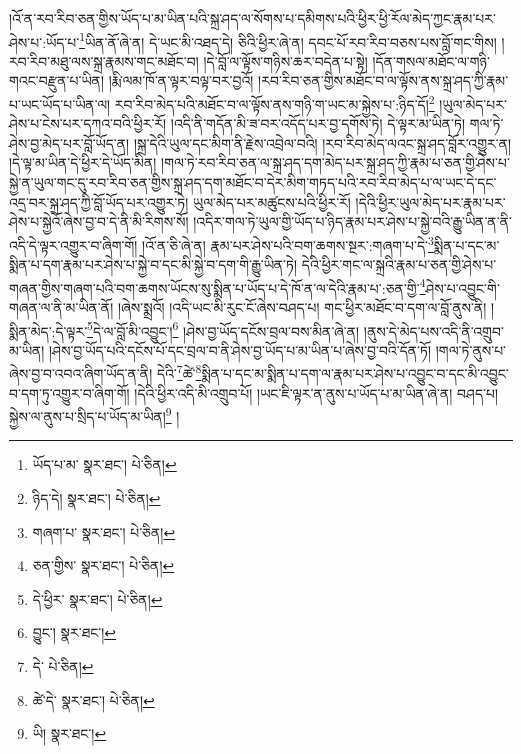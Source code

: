 །འོ་ན་རབ་རིབ་ཅན་གྱིས་ཡོད་པ་མ་ཡིན་པའི་སྐྲ་ཤད་ལ་སོགས་པ་དམིགས་པའི་ཕྱིར་ཕྱི་རོལ་མེད་ཀྱང་རྣམ་པར་ཤེས་པ་:ཡོད་པ་\footnote{ཡོད་པ་མ་  སྣར་ཐང་།  པེ་ཅིན། }ཡིན་ནོ་ཞེ་ན། དེ་ཡང་མི་འཐད་དེ། ཅིའི་ཕྱིར་ཞེ་ན། དབང་པོ་རབ་རིབ་བཅས་པས་བློ་གང་གིས། །རབ་རིབ་མཐུ་ལས་སྐྲ་རྣམས་གང་མཐོང་བ། །དེ་བློ་ལ་ལྟོས་གཉིས་ཆར་བདེན་པ་སྟེ། །དོན་གསལ་མཐོང་ལ་གཉི་གའང་བརྫུན་པ་ཡིན། །རྨི་ལམ་ཁོ་ན་ལྟར་བལྟ་བར་བྱའོ། །རབ་རིབ་ཅན་གྱིས་མཐོང་བ་ལ་ལྟོས་ནས་སྐྲ་ཤད་ཀྱི་རྣམ་པ་ཡང་ཡོད་པ་ཡིན་ལ། རབ་རིབ་མེད་པའི་མཐོང་བ་ལ་ལྟོས་ནས་གཉི་ག་ཡང་མ་སྐྱེས་པ་:ཉིད་དོ།\footnote{ཉིད་དེ།  སྣར་ཐང་།  པེ་ཅིན། } །ཡུལ་མེད་པར་ཤེས་པ་ངེས་པར་དཀའ་བའི་ཕྱིར་རོ། །འདི་ནི་གདོན་མི་ཟ་བར་འདོད་པར་བྱ་དགོས་ཏེ། དེ་ལྟར་མ་ཡིན་ཏེ། གལ་ཏེ་ཤེས་བྱ་མེད་པར་བློ་ཡོད་ན། །སྐྲ་དེའི་ཡུལ་དང་མིག་ནི་རྗེས་འབྲེལ་བའི། །རབ་རིབ་མེད་ལའང་སྐྲ་ཤད་བློར་འགྱུར་ན། །དེ་ལྟ་མ་ཡིན་དེ་ཕྱིར་དེ་ཡོད་མིན། །གལ་ཏེ་རབ་རིབ་ཅན་ལ་སྐྲ་ཤད་དག་མེད་པར་སྐྲ་ཤད་ཀྱི་རྣམ་པ་ཅན་གྱི་ཤེས་པ་སྐྱེ་ན་ཡུལ་གང་དུ་རབ་རིབ་ཅན་གྱིས་སྐྲ་ཤད་དག་མཐོང་བ་དེར་མིག་གཏད་པའི་རབ་རིབ་མེད་པ་ལ་ཡང་དེ་དང་འདྲ་བར་སྐྲ་ཤད་ཀྱི་བློ་ཡོད་པར་འགྱུར་ཏེ། ཡུལ་མེད་པར་མཚུངས་པའི་ཕྱིར་རོ། །དེའི་ཕྱིར་ཡུལ་མེད་པར་རྣམ་པར་ཤེས་པ་སྐྱེའོ་ཞེས་བྱ་བ་དེ་ནི་མི་རིགས་སོ། །འདིར་གལ་ཏེ་ཡུལ་གྱི་ཡོད་པ་ཉིད་རྣམ་པར་ཤེས་པ་སྐྱེ་བའི་རྒྱུ་ཡིན་ན་ནི་འདི་དེ་ལྟར་འགྱུར་བ་ཞིག་གོ། །འོ་ན་ཅི་ཞེ་ན། རྣམ་པར་ཤེས་པའི་བག་ཆགས་སྔར་:གཞག་པ་དེ་\footnote{གཞག་པ་  སྣར་ཐང་།  པེ་ཅིན། }སྨིན་པ་དང་མ་སྨིན་པ་དག་རྣམ་པར་ཤེས་པ་སྐྱེ་བ་དང་མི་སྐྱེ་བ་དག་གི་རྒྱུ་ཡིན་ཏེ། དེའི་ཕྱིར་གང་ལ་སྐྲའི་རྣམ་པ་ཅན་གྱི་ཤེས་པ་གཞན་གྱིས་གཞག་པའི་བག་ཆགས་ཡོངས་སུ་སྨིན་པ་ཡོད་པ་དེ་ཁོ་ན་ལ་དེའི་རྣམ་པ་:ཅན་གྱི་\footnote{ཅན་གྱིས་  སྣར་ཐང་།  པེ་ཅིན། }ཤེས་པ་འབྱུང་གི་གཞན་ལ་ནི་མ་ཡིན་ནོ། །ཞེས་སྨྲའོ། །འདི་ཡང་མི་རུང་ངོ་ཞེས་བཤད་པ། གང་ཕྱིར་མཐོང་བ་དག་ལ་བློ་ནུས་ནི། །སྨིན་མེད་:དེ་ལྟར་\footnote{དེ་ཕྱིར་  སྣར་ཐང་།  པེ་ཅིན། }དེ་ལ་བློ་མི་འབྱུང་།\footnote{བྱུང་།  སྣར་ཐང་། } །ཤེས་བྱ་ཡོད་དངོས་བྲལ་བས་མིན་ཞེ་ན། །ནུས་དེ་མེད་པས་འདི་ནི་འགྲུབ་མ་ཡིན། །ཤེས་བྱ་ཡོད་པའི་དངོས་པོ་དང་བྲལ་བ་ནི་ཤེས་བྱ་ཡོད་པ་མ་ཡིན་པ་ཞེས་བྱ་བའི་དོན་ཏོ། །གལ་ཏེ་ནུས་པ་ཞེས་བྱ་བ་འབའ་ཞིག་ཡོད་ན་ནི། དེའི་\footnote{དེ་  པེ་ཅིན། }ཚེ་\footnote{ཚེ་དེ་  སྣར་ཐང་།  པེ་ཅིན། }སྨིན་པ་དང་མ་སྨིན་པ་དག་ལ་རྣམ་པར་ཤེས་པ་འབྱུང་བ་དང་མི་འབྱུང་བ་དག་ཏུ་འགྱུར་བ་ཞིག་གོ། །དེའི་ཕྱིར་འདི་མི་འགྲུབ་པོ། །ཡང་ཇི་ལྟར་ན་ནུས་པ་ཡོད་པ་མ་ཡིན་ཞེ་ན། བཤད་པ། སྐྱེས་ལ་ནུས་པ་སྲིད་པ་ཡོད་མ་ཡིན།\footnote{ཡི།  སྣར་ཐང་། } །
